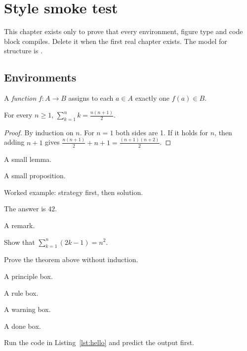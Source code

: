 \chapter{Style smoke test}\label{ch:smoke}
This chapter exists only to prove that every environment, figure type and code block compiles. Delete it when the first real chapter exists. The model for structure is \cite{sannemo2025}.

\section{Environments}
\begin{definition}[Function]
A \emph{function} $f:A\to B$ assigns to each $a\in A$ exactly one $f(a)\in B$.
\end{definition}
\begin{theorem}
For every $n\ge 1$, $\sum_{k=1}^{n}k=\frac{n(n+1)}{2}$.
\end{theorem}
\begin{proof}
By induction on $n$. For $n=1$ both sides are 1. If it holds for $n$, then adding $n+1$ gives $\frac{n(n+1)}2+n+1=\frac{(n+1)(n+2)}2$.
\end{proof}
\begin{lemma}A small lemma.\end{lemma}
\begin{proposition}A small proposition.\end{proposition}
\begin{example}\label{ex:one}
Worked example: strategy first, then solution.\par
\begin{solution}The answer is $42$.\end{solution}
\end{example}
\begin{remark}A remark.\end{remark}
\begin{exercise}[easy] Show that $\sum_{k=1}^{n}(2k-1)=n^2$.\end{exercise}
\begin{exercise}[hard] Prove the theorem above without induction.\end{exercise}
\begin{principle}[Principle]A principle box.\end{principle}
\begin{rulebox}A rule box.\end{rulebox}
\begin{tripwire}[Tripwire]A warning box.\end{tripwire}
\begin{wins}A done box.\end{wins}
\begin{checkpoint}[Try it] Run the code in Listing~\ref{lst:hello} and predict the output first.\end{checkpoint}

